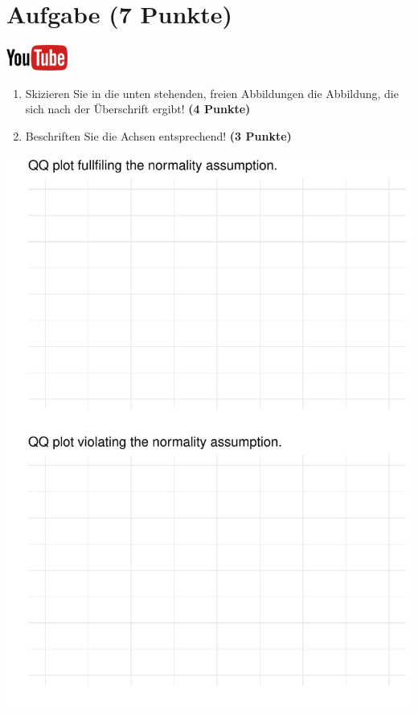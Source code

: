 \documentclass[a4paper, 9pt]{scrartcl}\usepackage[]{graphicx}\usepackage[]{xcolor}
\makeatletter
\def\maxwidth{ %
  \ifdim\Gin@nat@width>\linewidth
    \linewidth
  \else
    \Gin@nat@width
  \fi
}
\makeatother
\begin{document}
 
\clearpage

\section{Aufgabe \hfill (7 Punkte)}

\hfill\href{https://youtu.be/cYyvOXR4qa8}{\includegraphics[width =
  2cm]{img/youtube}}\\[1Ex]




\begin{enumerate}
\item Skizieren Sie in die unten stehenden, freien Abbildungen die
  Abbildung, die sich nach der {\"U}berschrift ergibt! \textbf{(4 Punkte)}
\item Beschriften Sie die Achsen entsprechend! \textbf{(3 Punkte)}
\end{enumerate}



{\centering \includegraphics[width=\maxwidth]{img/regression-04-1} 

}
\end{document}

